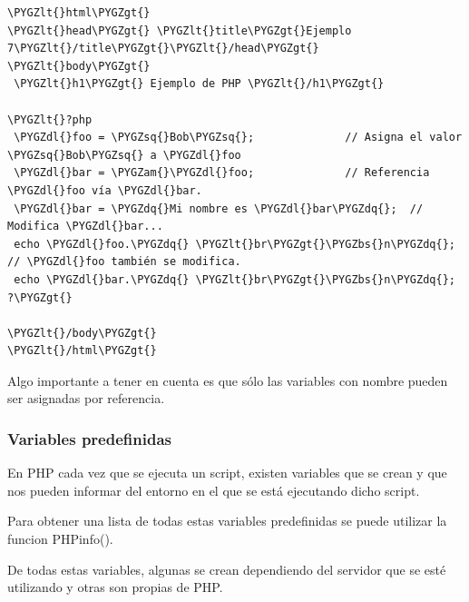 \documentclass[a5paper,10pt,spanish]{sphinxmanual}
\def\PYGZbs{\char`\\}
\def\PYGZam{\char`\&}
\def\PYGZlt{\char`\<}
\def\PYGZgt{\char`\>}
\def\PYGZdl{\char`\$}
\def\PYGZsq{\char`\'}
\def\PYGZdq{\char`\"}
\begin{document}
\begin{Verbatim}[commandchars=\\\{\}]
\PYGZlt{}html\PYGZgt{}
\PYGZlt{}head\PYGZgt{} \PYGZlt{}title\PYGZgt{}Ejemplo 7\PYGZlt{}/title\PYGZgt{}\PYGZlt{}/head\PYGZgt{}
\PYGZlt{}body\PYGZgt{}
 \PYGZlt{}h1\PYGZgt{} Ejemplo de PHP \PYGZlt{}/h1\PYGZgt{}

\PYGZlt{}?php
 \PYGZdl{}foo = \PYGZsq{}Bob\PYGZsq{};              // Asigna el valor \PYGZsq{}Bob\PYGZsq{} a \PYGZdl{}foo
 \PYGZdl{}bar = \PYGZam{}\PYGZdl{}foo;              // Referencia \PYGZdl{}foo vía \PYGZdl{}bar.
 \PYGZdl{}bar = \PYGZdq{}Mi nombre es \PYGZdl{}bar\PYGZdq{};  // Modifica \PYGZdl{}bar...
 echo \PYGZdl{}foo.\PYGZdq{} \PYGZlt{}br\PYGZgt{}\PYGZbs{}n\PYGZdq{};                 // \PYGZdl{}foo también se modifica.
 echo \PYGZdl{}bar.\PYGZdq{} \PYGZlt{}br\PYGZgt{}\PYGZbs{}n\PYGZdq{};
?\PYGZgt{}

\PYGZlt{}/body\PYGZgt{}
\PYGZlt{}/html\PYGZgt{}
\end{Verbatim}

Algo importante a tener en cuenta es que sólo las variables con nombre
pueden ser asignadas por referencia.


\subsubsection{Variables predefinidas}
\label{Tutorial1_Conceptos.md:variables-predefinidas}
En PHP cada vez que se ejecuta un script, existen variables que se crean
y que nos pueden informar del entorno en el que se está ejecutando dicho
script.

Para obtener una lista de todas estas variables predefinidas se puede
utilizar la funcion PHPinfo().

De todas estas variables, algunas se crean dependiendo del servidor que
se esté utilizando y otras son propias de PHP.
\end{document}
